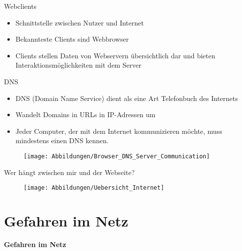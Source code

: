\documentclass[hyperref={colorlinks,linkcolor=blue}, utf8]{beamer}
\begin{document}
	\begin{frame}{Webclients}
		\begin{itemize}
			\item Schnittstelle zwischen Nutzer und Internet
			\item Bekannteste Clients sind Webbrowser
			\item Clients stellen Daten von Webservern übersichtlich dar und bieten Interaktionsmöglichkeiten mit dem Server
		\end{itemize}
	\end{frame}
	
	\begin{frame}{DNS}
		\begin{itemize}
			\item DNS (Domain Name Service) dient als eine Art Telefonbuch des Internets
			\item Wandelt Domains in URLs in IP-Adressen um
			\item Jeder Computer, der mit dem Internet kommunizieren möchte, muss mindestens einen DNS kennen.
		\end{itemize}
	
		\begin{figure}[H]
			\texttt{[image: Abbildungen/Browser\_DNS\_Server\_Communication]}
		\end{figure}				
	\end{frame}
	
	\begin{frame}{Wer hängt zwischen mir und der Webseite?}
		\begin{figure}[H]
			\texttt{[image: Abbildungen/Uebersicht\_Internet]}
			\label{fig:Übersicht des Internets}
		\end{figure}
	\end{frame}
	
	\section{Gefahren im Netz}
	\begin{frame}
		\centering \huge \textbf{Gefahren im Netz}
	\end{frame}
	
\end{document}
